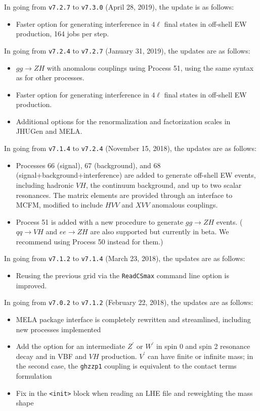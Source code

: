 \documentclass[aps,superscriptaddress,nofootinbib]{revtex4}
\begin{document}
\noindent
%
In going from \verb|v7.2.7| to \verb|v7.3.0| (April 28, 2019), the update is as follows:
\begin{itemize}
\item Faster option for generating interference in \(4\ell\) final states in off-shell EW production, 164 jobs per step.
\end{itemize}
\noindent
%
In going from \verb|v7.2.4| to \verb|v7.2.7| (January 31, 2019), the updates are as follows:
\begin{itemize}
\item $gg\to ZH$ with anomalous couplings using Process 51, using the same syntax as for other processes.
\item Faster option for generating interference in \(4\ell\) final states in off-shell EW production.
\item Additional options for the renormalization and factorization scales in JHUGen and MELA.
\end{itemize}
\noindent
In going from \verb|v7.1.4| to \verb|v7.2.4| (November 15, 2018), the updates are as follows:
\begin{itemize}
\item Processes 66 (signal), 67 (background), and 68 (signal+background+interference) are added to generate off-shell EW events, including hadronic $VH$, the continuum background, and up to two scalar resonances.  The matrix elements are provided through an interface to MCFM, modified to include $HVV$ and $XVV$ anomalous couplings.
\item Process 51 is added with a new procedure to generate $gg \to ZH$ events.  ($qq\to VH$ and $ee\to ZH$ are also supported but currently in beta.  We recommend using Process 50 instead for them.)
\end{itemize}
\noindent
In going from \verb|v7.1.2| to \verb|v7.1.4| (March 23, 2018), the updates are as follows:
\begin{itemize}
\item Reusing the previous grid via the \verb|ReadCSmax| command line option is improved.
\end{itemize}
\noindent
In going from \verb|v7.0.2| to \verb|v7.1.2| (February 22, 2018), the updates are as follows:
\begin{itemize}
\item MELA package interface is completely rewritten and streamlined, including new processes implemented
\item Add the option for an intermediate $Z^\prime$ or $W^\prime$ in spin 0 and spin 2 resonance decay and in VBF and $VH$ production.  $V^\prime$ can have finite or infinite mass; in the second case, the \verb|ghzzp1| coupling is equivalent to the contact terms formulation~\cite{Gonzalez-Alonso:2014eva}
\item Fix in the \verb|<init>| block when reading an LHE file and reweighting the mass shape
\end{itemize}
\end{document}
